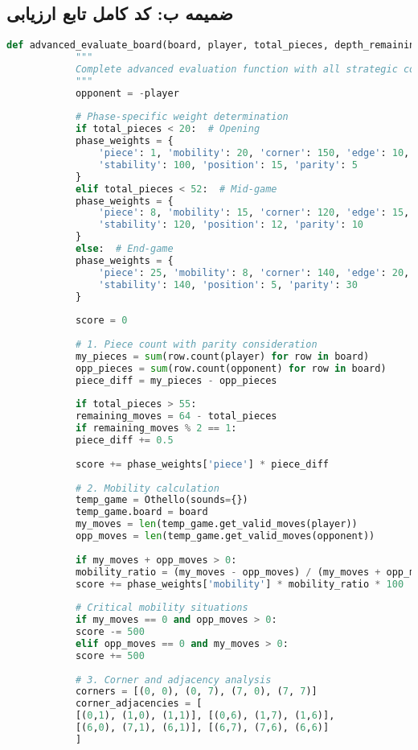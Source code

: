 \documentclass[12pt]{article}
\newenvironment{ltrcode}{\lr\bgroup}{\egroup}
\begin{document}
	\subsection{ضمیمه ب: کد کامل تابع ارزیابی}
	
	\begin{ltrcode}
		\begin{lstlisting}[language=Python, caption=Complete Advanced Evaluation Function]
			def advanced_evaluate_board(board, player, total_pieces, depth_remaining=0):
			"""
			Complete advanced evaluation function with all strategic components
			"""
			opponent = -player
			
			# Phase-specific weight determination
			if total_pieces < 20:  # Opening
			phase_weights = {
				'piece': 1, 'mobility': 20, 'corner': 150, 'edge': 10,
				'stability': 100, 'position': 15, 'parity': 5
			}
			elif total_pieces < 52:  # Mid-game
			phase_weights = {
				'piece': 8, 'mobility': 15, 'corner': 120, 'edge': 15,
				'stability': 120, 'position': 12, 'parity': 10
			}
			else:  # End-game
			phase_weights = {
				'piece': 25, 'mobility': 8, 'corner': 140, 'edge': 20,
				'stability': 140, 'position': 5, 'parity': 30
			}
			
			score = 0
			
			# 1. Piece count with parity consideration
			my_pieces = sum(row.count(player) for row in board)
			opp_pieces = sum(row.count(opponent) for row in board)
			piece_diff = my_pieces - opp_pieces
			
			if total_pieces > 55:
			remaining_moves = 64 - total_pieces
			if remaining_moves % 2 == 1:
			piece_diff += 0.5
			
			score += phase_weights['piece'] * piece_diff
			
			# 2. Mobility calculation
			temp_game = Othello(sounds={})
			temp_game.board = board
			my_moves = len(temp_game.get_valid_moves(player))
			opp_moves = len(temp_game.get_valid_moves(opponent))
			
			if my_moves + opp_moves > 0:
			mobility_ratio = (my_moves - opp_moves) / (my_moves + opp_moves + 1)
			score += phase_weights['mobility'] * mobility_ratio * 100
			
			# Critical mobility situations
			if my_moves == 0 and opp_moves > 0:
			score -= 500
			elif opp_moves == 0 and my_moves > 0:
			score += 500
			
			# 3. Corner and adjacency analysis
			corners = [(0, 0), (0, 7), (7, 0), (7, 7)]
			corner_adjacencies = [
			[(0,1), (1,0), (1,1)], [(0,6), (1,7), (1,6)],
			[(6,0), (7,1), (6,1)], [(6,7), (7,6), (6,6)]
			]
			

\end{lstlisting}
\end{ltrcode}
\end{document}
